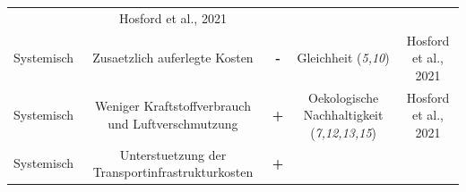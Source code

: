 \documentclass[
]{book}
\begin{document}
\begin{longtable}[]{@{}ccccc@{}}
\begin{minipage}[t]{0.17\columnwidth}
\end{minipage} & \begin{minipage}[t]{0.17\columnwidth}\centering
Hosford et al., 2021\strut
\end{minipage}\tabularnewline
\begin{minipage}[t]{0.17\columnwidth}\centering
Systemisch\strut
\end{minipage} & \begin{minipage}[t]{0.16\columnwidth}\centering
Zusaetzlich auferlegte Kosten\strut
\end{minipage} & \begin{minipage}[t]{0.17\columnwidth}\centering
\textbf{-}\strut
\end{minipage} & \begin{minipage}[t]{0.17\columnwidth}\centering
Gleichheit (\emph{5,10})\strut
\end{minipage} & \begin{minipage}[t]{0.17\columnwidth}\centering
Hosford et al., 2021\strut
\end{minipage}\tabularnewline
\begin{minipage}[t]{0.17\columnwidth}\centering
Systemisch\strut
\end{minipage} & \begin{minipage}[t]{0.16\columnwidth}\centering
Weniger Kraftstoffverbrauch und Luftverschmutzung\strut
\end{minipage} & \begin{minipage}[t]{0.17\columnwidth}\centering
\textbf{+}\strut
\end{minipage} & \begin{minipage}[t]{0.17\columnwidth}\centering
Oekologische Nachhaltigkeit (\emph{7,12,13,15})\strut
\end{minipage} & \begin{minipage}[t]{0.17\columnwidth}\centering
Hosford et al., 2021\strut
\end{minipage}\tabularnewline
\begin{minipage}[t]{0.17\columnwidth}\centering
Systemisch\strut
\end{minipage} & \begin{minipage}[t]{0.16\columnwidth}\centering
Unterstuetzung der Transportinfrastrukturkosten\strut
\end{minipage} & \begin{minipage}[t]{0.17\columnwidth}\centering
\textbf{+}\strut
\end{minipage} & \begin{minipage}[t]{0.17\columnwidth}\centering

\end{minipage}
\end{longtable}
\end{document}
